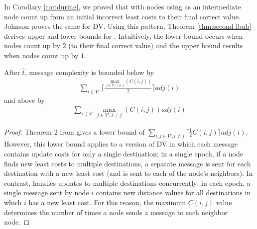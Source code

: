 {{In Corollary \ref{cor:during}, we proved that with \second nodes using \bad as an intermediate node count up from an initial incorrect least costs to their final correct value.  
Johnson proves the same for DV. 
Using this pattern, Theorem \ref{thm:second-lbub} derives upper and lower bounds for \seconds.  Intuitively, the lower bound occurs when nodes count up by $2$ (to their final correct
value) and the upper bound results when nodes count up by $1$. 


\begin{theorem}
\label{thm:second-lbub}
After $\hat{t}$, \second message complexity is bounded below by 
\begin{eqnarray}
\label{thm:second-lb}
\sum_{i \in V'} \Big\lceil  \frac{\max_{j \in V', i \neq j} \left( C(i,j) \right)}{2}  \Big\rceil adj(i)
\end{eqnarray}
and above by 
\begin{eqnarray}
\label{thm:second-ub}
\sum_{i \in V'} \max_{j \in V', i \neq j} \left( C(i,j) \right) adj(i)
\end{eqnarray}
\end{theorem}

\begin{proof}
Theorem 2 from \cite{Johnson84} gives a lower bound of $\displaystyle \sum_{i,j \in V', i \neq j} \Big\lceil  \frac{1}{2} C(i,j)  \Big\rceil adj(i)$. 
However, this lower bound applies to a version of 
DV in which each message contains update costs for only a single destination; in a single epoch, if a node finds new least costs to multiple destinations, 
a separate message is sent for each destination with a new least cost (and is sent to each of the node's neighbors).
In contrast, \second handles updates to multiple destinations concurrently: in each epoch, a single message sent by node $i$ contains new distance values for all destinations in which $i$ has 
a new least cost. For this reason, the maximum $C(i,j)$ value determines the number of times a node sends a message to each neighbor node. 



\end{proof}}}
